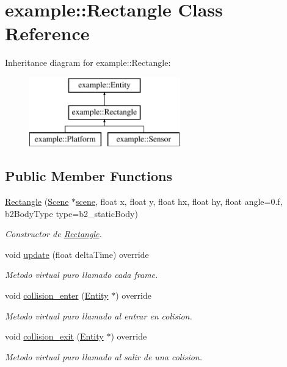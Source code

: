 \hypertarget{classexample_1_1_rectangle}{}\section{example\+::Rectangle Class Reference}
\label{classexample_1_1_rectangle}
Inheritance diagram for example\+::Rectangle\+:\begin{figure}[H]
\begin{center}
\leavevmode
\includegraphics[height=3.000000cm]{classexample_1_1_rectangle}
\end{center}
\end{figure}
\subsection*{Public Member Functions}
\begin{DoxyCompactItemize}
\item 
\mbox{\hyperlink{classexample_1_1_rectangle_a5de4b398c9343b9a78af13098339fe65}{Rectangle}} (\mbox{\hyperlink{classexample_1_1_scene}{Scene}} $\ast$\mbox{\hyperlink{classexample_1_1_entity_ab851dbde4a16829f9fb77ab9a66b9f1e}{scene}}, float x, float y, float hx, float hy, float angle=0.f, b2\+Body\+Type type=b2\+\_\+static\+Body)
\begin{DoxyCompactList}\small\item\em Constructor de \mbox{\hyperlink{classexample_1_1_rectangle}{Rectangle}}. \end{DoxyCompactList}\item 
void \mbox{\hyperlink{classexample_1_1_rectangle_a346951183565830ee4b262c8c66f2673}{update}} (float delta\+Time) override
\begin{DoxyCompactList}\small\item\em Metodo virtual puro llamado cada frame. \end{DoxyCompactList}\item 
void \mbox{\hyperlink{classexample_1_1_rectangle_a60fa2e1468370d1c7021f25df8a4c1d7}{collision\+\_\+enter}} (\mbox{\hyperlink{classexample_1_1_entity}{Entity}} $\ast$) override
\begin{DoxyCompactList}\small\item\em Metodo virtual puro llamado al entrar en colision. \end{DoxyCompactList}\item 
void \mbox{\hyperlink{classexample_1_1_rectangle_a547c35d87f139ffc190f542830606754}{collision\+\_\+exit}} (\mbox{\hyperlink{classexample_1_1_entity}{Entity}} $\ast$) override
\begin{DoxyCompactList}\small\item\em Metodo virtual puro llamado al salir de una colision. \end{DoxyCompactList}\end{DoxyCompactItemize}
